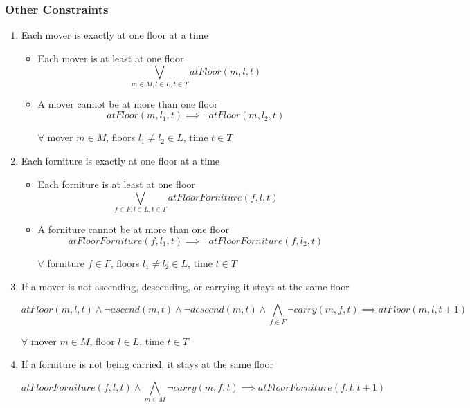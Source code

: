 \documentclass[a4paper, 11pt]{article}
\begin{document}
\subsubsection{Other Constraints}

\begin{enumerate}
    \item Each mover is exactly at one floor at a time

    \begin{itemize}
        \item Each mover is at least at one floor
        $$ \bigvee_{m \in M, l \in L, t\in T} atFloor(m, l, t) $$

        \item A mover cannot be at more than one floor
        $$ atFloor(m, l_1, t) \implies \lnot atFloor(m, l_2, t) $$

        $\forall$ mover $m \in M$, floors $l_1 \neq l_2 \in L$, time $t \in T$
    \end{itemize}

    \item Each forniture is exactly at one floor at a time

    \begin{itemize}
        \item Each forniture is at least at one floor
        $$ \bigvee_{f \in F, l \in L, t\in T} atFloorForniture(f, l, t) $$

        \item A forniture cannot be at more than one floor
        $$ atFloorForniture(f, l_1, t) \implies \lnot atFloorForniture(f, l_2, t) $$

        $\forall$ forniture $f \in F$, floors $l_1 \neq l_2 \in L$, time $t \in T$
    \end{itemize}

    \item If a mover is not ascending, descending, or carrying it stays at the same floor

    $$atFloor(m,l,t) \land \lnot ascend(m, t) \land \lnot descend(m, t) \land \bigwedge_{f \in F} \lnot carry(m, f, t) \implies atFloor(m,l, t+1) $$

    $\forall$ mover $m \in M$, floor $l \in L$, time $t \in T$

    \item If a forniture is not being carried, it stays at the same floor

    $$atFloorForniture(f, l, t) \land \bigwedge_{m \in M} \lnot carry(m, f, t) \implies atFloorForniture(f, l, t + 1)$$


\end{enumerate}
\end{document}
